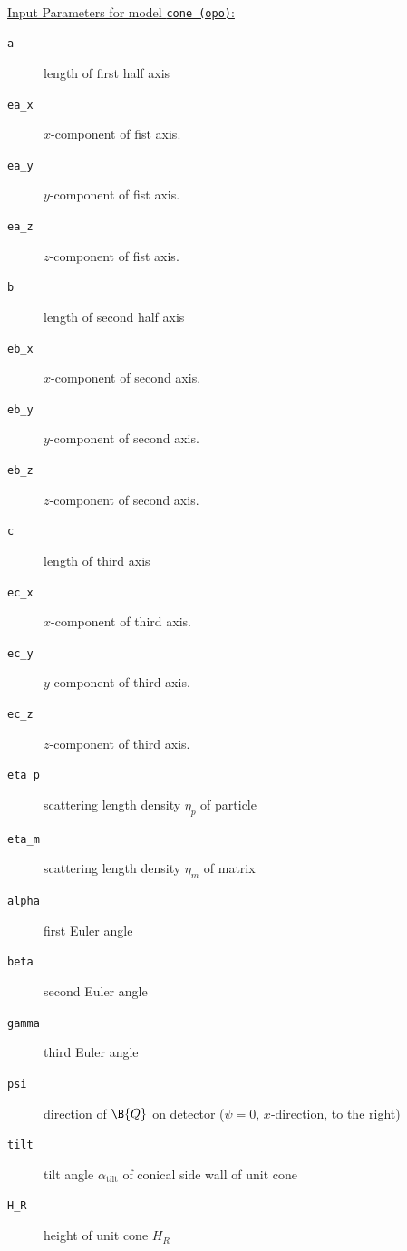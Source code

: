 ~\\
\underline{Input Parameters for model \texttt{cone (opo)}:}
\begin{description}
\item[\texttt{a}] length of first half axis
\item[\texttt{ea\_x}] $x$-component of fist axis.
\item[\texttt{ea\_y}] $y$-component of fist axis.
\item[\texttt{ea\_z}] $z$-component of fist axis.
\item[\texttt{b}] length of second half axis
\item[\texttt{eb\_x}] $x$-component of second axis.
\item[\texttt{eb\_y}] $y$-component of second axis.
\item[\texttt{eb\_z}] $z$-component of second axis.
\item[\texttt{c}] length of third axis
\item[\texttt{ec\_x}] $x$-component of third axis.
\item[\texttt{ec\_y}] $y$-component of third axis.
\item[\texttt{ec\_z}] $z$-component of third axis.
\item[\texttt{eta\_p}] scattering length density $\eta_p$ of particle
\item[\texttt{eta\_m}] scattering length density $\eta_m$ of matrix
\item[\texttt{alpha}] first Euler angle
\item[\texttt{beta}] second Euler angle
\item[\texttt{gamma}] third Euler angle
\item[\texttt{psi}] direction of $\B{Q}$ on detector ($\psi=0$, $x$-direction, to the right)
\item[\texttt{tilt}] tilt angle $\alpha_\mathrm{tilt}$ of conical side wall of unit cone
\item[\texttt{H\_R}] height of unit cone $H_R$
\end{description}

